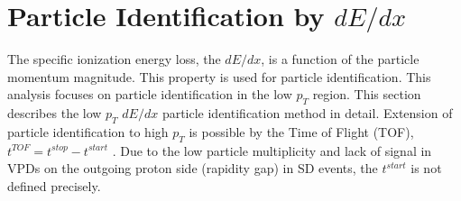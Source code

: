 \section{Particle Identification by $dE/dx$}\label{sec:pid}
The specific ionization energy loss, the $dE/dx$, is a function of the
particle momentum magnitude. This property is used
for particle identification. This analysis focuses on particle
identification in the low $p_T$ region. This section describes
the low $p_T$ $dE/dx$ particle identification method in detail.
Extension of particle identification to high $p_T$ is possible
by the Time of Flight (TOF), $t^{TOF}=t^{stop}-t^{start}$ . Due to the low particle multiplicity and lack of signal in VPDs on the outgoing proton side (rapidity gap) in SD events, the $t^{start}$ is not defined precisely.
\begin{figure}[H]
	\centering
	\parbox{0.484\textwidth}{
		\centering
		\begin{subfigure}[b]{\linewidth}{
				}
		\end{subfigure}
	}
	\quad
	\parbox{0.484\textwidth}{
		\centering
		\begin{subfigure}[b]{\linewidth}{
				}

\end{subfigure}}
\end{figure}

